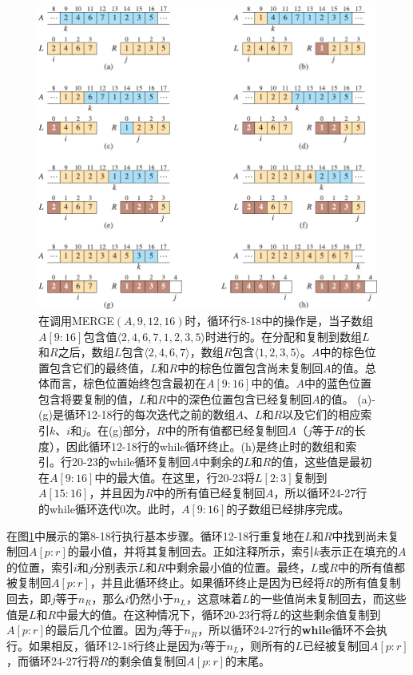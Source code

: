 \documentclass[lang=cn,newtx,10pt,scheme=chinese]{elegantbook}
\begin{document}
\begin{figure}[htbp]
    \centering
    \includegraphics{算法导论第四版插图/第二章/归并过程示意图.pdf}
    \caption{在调用MERGE$(A,9,12,16)$时，循环行8-18中的操作是，当子数组$A[9:16]$包含值$\langle 2,4,6,7,1,2,3,5 \rangle$时进行的。在分配和复制到数组$L$和$R$之后，数组$L$包含$\langle 2,4,6,7 \rangle$，数组$R$包含$\langle 1,2,3,5 \rangle$。$A$中的棕色位置包含它们的最终值，$L$和$R$中的棕色位置包含尚未复制回$A$的值。总体而言，棕色位置始终包含最初在$A[9:16]$中的值。$A$中的蓝色位置包含将要复制的值，$L$和$R$中的深色位置包含已经复制回$A$的值。 (a)-(g)是循环12-18行的每次迭代之前的数组$A$、$L$和$R$以及它们的相应索引$k$、$i$和$j$。在(g)部分，$R$中的所有值都已经复制回$A$（$j$等于$R$的长度），因此循环12-18行的while循环终止。(h)是终止时的数组和索引。行20-23的while循环复制回$A$中剩余的$L$和$R$的值，这些值是最初在$A[9:16]$中的最大值。在这里，行20-23将$L[2:3]$复制到$A[15:16]$，并且因为$R$中的所有值已经复制回$A$，所以循环24-27行的while循环迭代0次。此时，$A[9:16]$的子数组已经排序完成。}
    \label{fig:归并过程示意图}
\end{figure}

在图\ref{fig:归并过程示意图}中展示的第8-18行执行基本步骤。循环12-18行重复地在$L$和$R$中找到尚未复制回$A[p:r]$的最小值，并将其复制回去。正如注释所示，索引$k$表示正在填充的$A$的位置，索引$i$和$j$分别表示$L$和$R$中剩余最小值的位置。最终，$L$或$R$中的所有值都被复制回$A[p:r]$，并且此循环终止。如果循环终止是因为已经将$R$的所有值复制回去，即$j$等于$n_R$，那么$i$仍然小于$n_L$，这意味着$L$的一些值尚未复制回去，而这些值是$L$和$R$中最大的值。在这种情况下，循环20-23行将$L$的这些剩余值复制到$A[p:r]$的最后几个位置。因为$j$等于$n_R$，所以循环24-27行的\textbf{while}循环不会执行。如果相反，循环12-18行终止是因为$i$等于$n_L$，则所有的$L$已经被复制回$A[p:r]$，而循环24-27行将$R$的剩余值复制回$A[p:r]$的末尾。
\end{document}
